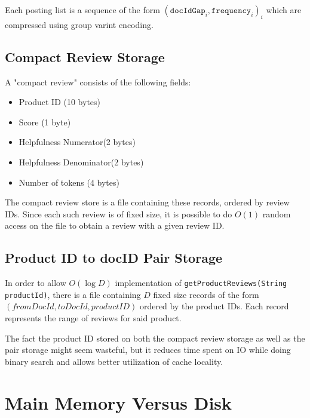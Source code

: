 \documentclass[11pt]{article}
\begin{document}
Each posting list is a sequence of the form $(\texttt{docIdGap}_i, \texttt{frequency}_i)_i$ which are compressed using group varint encoding.


\subsection{Compact Review Storage}
\label{sec:compactStorage}

A "compact review" consists of the following fields:

\begin{itemize}
	\item Product ID (10 bytes)
	\item Score (1 byte)
	\item Helpfulness Numerator(2 bytes)
	\item Helpfulness Denominator(2 bytes)
	\item Number of tokens (4 bytes)
\end{itemize}

The compact review store is a file containing these records, ordered by review IDs. Since
each such review is of fixed size, it is possible to do $O(1)$ random access on the file
to obtain a review with a given review ID. 

\subsection{Product ID to docID Pair Storage}
\label{sec:pairStorage}

In order to allow $O(\log D)$ implementation of \verb+getProductReviews(String productId)+, 
there is a file containing $D$ fixed size records of the form $(fromDocId, toDocId, productID)$ ordered
by the product IDs. Each record represents the range of reviews
for said product.

The fact the product ID stored on both the compact review storage as well as the pair storage might seem wasteful, but it reduces time spent on IO
while doing binary search and allows better utilization of cache locality.


\section{Main Memory Versus Disk}

\begin{comment}
{\em Put an explanation of which portions of the index are read into memory when an IndexReader object is created, and which portions will be read as needed. }
\end{comment}
\end{document}
